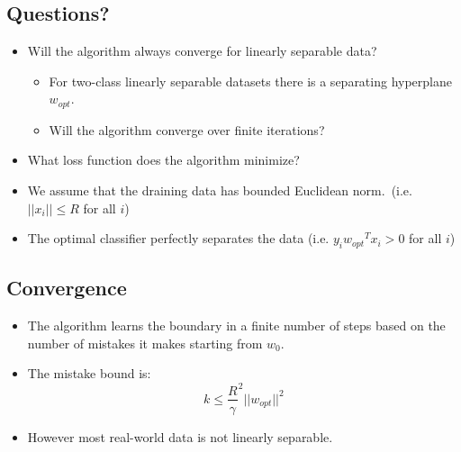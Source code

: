 \documentclass[12pt]{article}
\begin{document}
        \subsection{Questions?}
            \begin{itemize}
                \item Will the algorithm always converge for linearly separable data?
                \begin{itemize}
                    \item For two-class linearly separable datasets there is a separating hyperplane $w_{opt}$.
                    \item Will the algorithm converge over finite iterations?
                \end{itemize}
                \item What loss function does the algorithm minimize?
                \item We assume that the draining data has bounded Euclidean norm.\ (i.e. $||x_i|| \le R$ for all $i$)
                \item The optimal classifier perfectly separates the data (i.e. $y_i{w_{opt}}^T{x_i} > 0$ for all $i$)
            \end{itemize}
        \subsection{Convergence}
            \begin{itemize}
                \item The algorithm learns the boundary in a finite number of steps based on the number of mistakes it makes starting from $w_0$.
                \item The mistake bound is:
                \begin{equation}
                    k \le {\frac{R}{\gamma}}^2{||w_{opt}||}^2
                \end{equation}
                \item However most real-world data is not linearly separable.
            \end{itemize}
\end{document}
